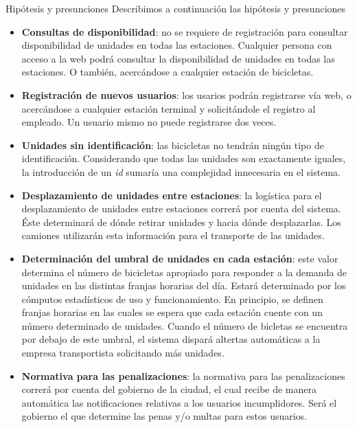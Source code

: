 \begin{subsection}{Hipótesis y presunciones}
Describimos a continuación las hipótesis y presunciones 
\begin{itemize}
\item \textbf{Consultas de disponibilidad}: no se requiere de registración para consultar disponibilidad de unidades en todas las estaciones. Cualquier persona con acceso a la web podrá consultar la disponibilidad de unidades en todas las estaciones. O también, acercándose a cualquier estación de bicicletas.

\item \textbf{Registración de nuevos usuarios}: los usarios podrán registrarse vía web, o acercándose a cualquier estación terminal y solicitándole el registro al empleado. Un usuario mismo no puede registrarse dos veces.

\item \textbf{Unidades sin identificación}: las bicicletas no tendrán ningún tipo de identificación. Considerando que todas las unidades son exactamente iguales, la introducción de un \emph{id} sumaría una complejidad innecesaria en el sistema.

\item \textbf{Desplazamiento de unidades entre estaciones}: la logística para el desplazamiento de unidades entre estaciones correrá por cuenta del sistema. Éste determinará de dónde retirar unidades y hacia dónde desplazarlas. Los camiones utilizarán esta información para el transporte de las unidades.

\item \textbf{Determinación del umbral de unidades en cada estación}: este valor determina el número de bicicletas apropiado para responder a la demanda de unidades en las distintas franjas horarias del día. Estará determinado por los cómputos estadísticos de uso y funcionamiento. En principio, se definen franjas horarias en las cuales se espera que cada estación cuente con un número determinado de unidades. Cuando el número de bicletas se encuentra por debajo de este umbral, el sistema dispará altertas automáticas a la empresa transportista solicitando más unidades.

\item \textbf{Normativa para las penalizaciones}: la normativa para las penalizaciones correrá por cuenta del gobierno de la ciudad, el cual recibe de manera automática las notificaciones relativas a los usuarios incumplidores. Será el gobierno el que determine las penas y/o multas para estos usuarios.


\end{itemize}
\end{subsection}
